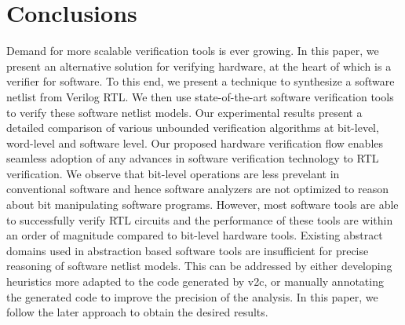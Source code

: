 \section{Conclusions}\label{sec:concl}
%
Demand for more scalable verification tools is ever growing.  In this paper,
we present an alternative solution for verifying hardware, at the heart of
which is a verifier for software.  To this end, we present a technique to 
synthesize a software netlist from Verilog RTL.  We then use state-of-the-art
software verification tools to verify these software netlist models.  Our 
experimental results present a detailed comparison of various unbounded 
verification algorithms at bit-level, word-level and software level.  Our proposed 
hardware verification flow enables seamless adoption of any advances in software 
verification technology to RTL verification.  We observe that bit-level operations 
are less prevelant in conventional software and hence software analyzers are not 
optimized to reason about bit manipulating software programs.  However, most software 
tools are able to successfully verify RTL circuits and the performance of these tools 
are within an order of magnitude compared to bit-level hardware tools.  Existing abstract 
domains used in abstraction based software tools are insufficient for precise reasoning 
of software netlist models.  This can be addressed by either developing heuristics 
more adapted to the code generated by v2c, or manually annotating the generated code 
to improve the precision of the analysis. In this paper, we follow the later approach 
to obtain the desired results. 
